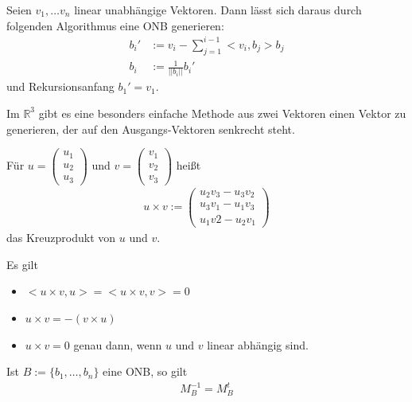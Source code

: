 \begin{Algorithmus}
Seien  $v_1, \hdots v_n$ linear unabhängige Vektoren.  Dann lässt sich daraus durch folgenden Algorithmus 
eine ONB generieren: 
\begin {align*}
b_i ' & := v_i - \sum_{j=1}^{i-1} <v_i, b_j> b_j \\
b_i  & :=  \frac{1}{||b_i||} b_i'
\end{align*}
und Rekursionsanfang $b_1' = v_1$.
\end{Algorithmus}


Im $\mathbb{R}^3$ gibt es eine besonders einfache Methode aus zwei Vektoren einen Vektor zu generieren, der auf den Ausgangs-Vektoren
senkrecht steht.
\begin{Definition}
Für $u = \begin{pmatrix} u_1 \\ u_2 \\ u_3 \end{pmatrix}$ und $v= \begin{pmatrix} v_1 \\ v_2 \\ v_3 \end{pmatrix}$ heißt
\begin{align*}
u \times v :=  \begin{pmatrix} u_2 v_3 - u_3v_2  \\ u_3 v_1 - u_1v_3 \\ u_1 v2 - u_2 v_1\end{pmatrix} 
\end{align*}
das Kreuzprodukt von $u$ und $v$.
\end{Definition}

\begin{Bemerkung}
Es gilt
\begin{itemize}
\item $<u \times v, u> =  <u \times v, v> = 0$ 
\item $u \times v = - (v \times u)$
\item $u \times v = 0$ genau dann, wenn $u$ und $v$ linear abhängig sind.
\end{itemize}
\end{Bemerkung}

\begin{Bemerkung}
Ist  $B:= \{ b_1, \hdots , b_n \}$  eine ONB, so gilt
\begin{align*}
M_{B}^{-1} = M_{B}^t
\end{align*}
\end{Bemerkung}

